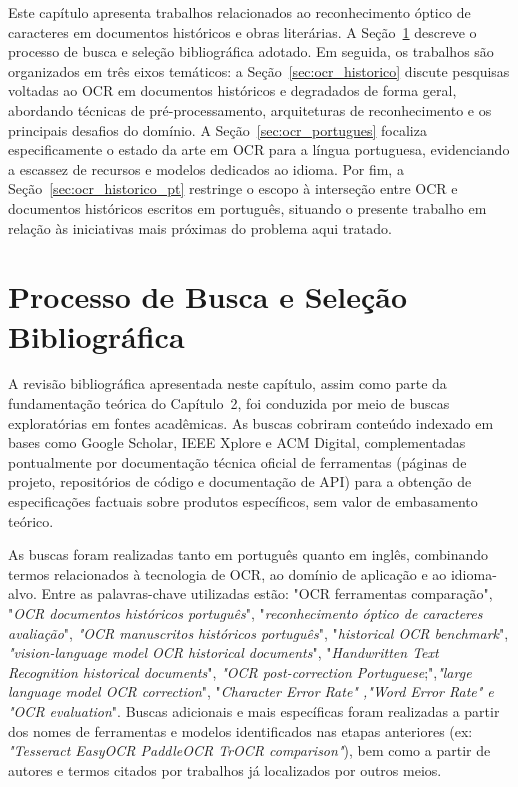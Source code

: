 \documentclass[
  12pt,
  oneside,
  a4paper,
  chapter=TITLE,
  section=TITLE,
  english,
  brazil
]{abntex2}
\begin{document}
Este capítulo apresenta trabalhos relacionados ao reconhecimento óptico de caracteres em
documentos históricos e obras literárias. A Seção~\ref{sec:metodologia_revisao} descreve
o processo de busca e seleção bibliográfica adotado. Em seguida, os trabalhos são
organizados em três eixos temáticos: a Seção~\ref{sec:ocr_historico} discute pesquisas
voltadas ao OCR em documentos históricos e degradados de forma geral, abordando técnicas
de pré-processamento, arquiteturas de reconhecimento e os principais desafios do domínio.
A Seção~\ref{sec:ocr_portugues} focaliza especificamente o estado da arte em OCR para a
língua portuguesa, evidenciando a escassez de recursos e modelos dedicados ao idioma.
Por fim, a Seção~\ref{sec:ocr_historico_pt} restringe o escopo à interseção entre OCR e
documentos históricos escritos em português, situando o presente trabalho em relação às
iniciativas mais próximas do problema aqui tratado.

\section{Processo de Busca e Seleção Bibliográfica}
\label{sec:metodologia_revisao}

A revisão bibliográfica apresentada neste capítulo, assim como parte da fundamentação
teórica do Capítulo~2, foi conduzida por meio de buscas exploratórias em fontes
acadêmicas. As buscas
cobriram conteúdo indexado em bases como Google Scholar, IEEE Xplore e ACM Digital, complementadas pontualmente por
documentação técnica oficial de ferramentas (páginas de projeto, repositórios de código
e documentação de API) para a obtenção de especificações factuais sobre produtos
específicos, sem valor de embasamento teórico.

As buscas foram realizadas tanto em português quanto em inglês, combinando termos
relacionados à tecnologia de OCR, ao domínio de aplicação e ao idioma-alvo. Entre as
palavras-chave utilizadas estão: "OCR ferramentas comparação", "\textit{OCR
documentos históricos português}", "\textit{reconhecimento óptico de caracteres avaliação}",
\textit{"OCR manuscritos históricos português}", "\textit{historical OCR benchmark}",
\textit{"vision-language model OCR historical documents}", "\textit{Handwritten Text
Recognition historical documents}", \textit{"OCR post-correction Portuguese};",\textit{"large
language model OCR correction}", "\textit{Character Error Rate" ,"Word Error Rate" e "OCR
evaluation}". Buscas adicionais e mais específicas foram realizadas a partir dos nomes de
ferramentas e modelos identificados nas etapas anteriores (ex: \textit{"Tesseract
EasyOCR PaddleOCR TrOCR comparison"}), bem como a partir de autores e termos citados por
trabalhos já localizados por outros meios.
\end{document}
